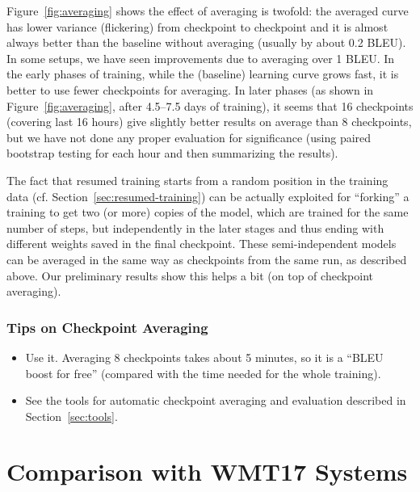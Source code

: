 \documentclass{pbmlarxiv} \pdfoutput=1
\def\Sref#1{Section~\ref{#1}}
\begin{document}
Figure~\ref{fig:averaging} shows the effect of averaging is twofold:
 the averaged curve has lower variance (flickering) from checkpoint to checkpoint
 and it is almost always better than the baseline without averaging
 (usually by about 0.2 BLEU).
In some setups, we have seen improvements due to averaging over 1 BLEU.
In the early phases of training, while the (baseline) learning curve grows fast,
 it is better to use fewer checkpoints for averaging.
In later phases (as shown in Figure~\ref{fig:averaging}, after 4.5--7.5 days of training),
 it seems that 16 checkpoints (covering last 16 hours) give
 slightly better results on average than 8 checkpoints,
 but we have not done any proper evaluation for significance
 (using paired bootstrap testing for each hour and then summarizing the results).

The fact that resumed training starts from a random position in the training data
 (cf. \Sref{sec:resumed-training})
 can be actually exploited for ``forking'' a training
 to get two (or more) copies of the model,
 which are trained for the same number of steps,
 but independently in the later stages
 and thus ending with different weights saved in the final checkpoint.
These semi-independent models can be averaged in the same way
 as checkpoints from the same run, as described above.
Our preliminary results show this helps a bit (on top of checkpoint averaging).

\subsubsection*{Tips on Checkpoint Averaging}
\begin{itemize}
\item Use it.
 Averaging 8 checkpoints takes about 5 minutes, so it is a ``BLEU boost for free''
  (compared with the time needed for the whole training).
\item See the tools for automatic checkpoint averaging and evaluation described in \Sref{sec:tools}.
\end{itemize}


\section{Comparison with WMT17 Systems}
\label{wmt-comparison}
\end{document}

